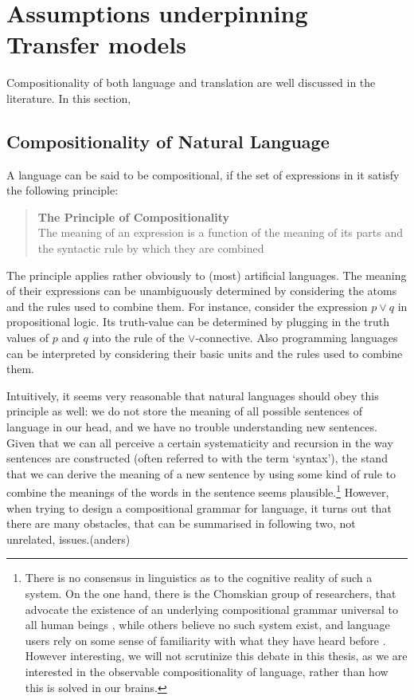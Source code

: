 \documentclass{report}
\theoremstyle{break}
\begin{document}
\section{Assumptions underpinning Transfer models}
\label{sec:assumptions}

Compositionality of both language and translation are well discussed in the literature. In this section,


\subsection{Compositionality of Natural Language}

A language can be said to be compositional, if the set of expressions in it satisfy the following principle:

\begin{quote}
\textbf{The Principle of Compositionality}\\
The meaning of an expression is a function of the meaning of its parts and the syntactic rule by which they are combined \citep{partee1984compositionality}
\end{quote}

The principle applies rather obviously to (most) artificial languages. The meaning of their expressions can be unambiguously determined by considering the atoms and the rules used to combine them. For instance, consider the expression $p\lor q$ in propositional logic. Its truth-value can be determined by plugging in the truth values of $p$ and $q$ into the rule of the $\lor$-connective. Also programming languages can be interpreted by considering their basic units and the rules used to combine them.

Intuitively, it seems very reasonable that natural languages should obey this principle as well: we do not store the meaning of all possible sentences of language in our head, and we have no trouble understanding new sentences. Given that we can all perceive a certain systematicity and recursion in the way sentences are constructed (often referred to with the term `syntax'), the stand that we can derive the meaning of a new sentence by using some kind of rule to combine the meanings of the words in the sentence seems plausible.\footnote{There is no consensus in linguistics as to the cognitive reality of such a system. On the one hand, there is the Chomskian group of researchers, that advocate the existence of an underlying compositional grammar universal to all human beings \citep[As first claimed in][]{chomsky1956three}, while others believe no such system exist, and language users rely on some sense of familiarity with what they have heard before \citep[e.g.,][]{scha1990taaltheorie}. However interesting, we will not scrutinize this debate in this thesis, as we are interested in the observable compositionality of language, rather than how this is solved in our brains.} However, when trying to design a compositional grammar for language, it turns out that there are many obstacles, that can be summarised in following two, not unrelated, issues.(anders)
\end{document}
